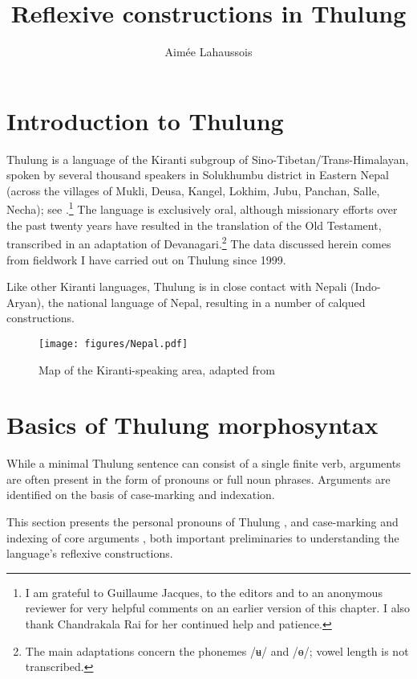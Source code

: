 \documentclass[output=paper]{langscibook}
\author{Aimée Lahaussois\affiliation{Laboratoire {Histoire} {des} {Théories} {Linguistiques}, CNRS, Université de Paris}}
\title{Reflexive constructions in Thulung}
\begin{document}
\maketitle


\section{Introduction to Thulung}
\label{sec:Lahaussois:1}

Thulung is a language of the Kiranti subgroup of Sino-Tibetan/Trans-Himalayan, spoken by several thousand speakers in Solukhumbu district in Eastern Nepal (across the villages of Mukli, Deusa, Kangel, Lokhim, Jubu, Panchan, Salle, Necha); see .\footnote{I am grateful to Guillaume Jacques, to the editors and to an anonymous reviewer for very helpful comments on an earlier version of this chapter.  I also thank Chandrakala Rai for her continued help and patience.}  The language is exclusively oral, although missionary efforts over the past twenty years have resulted in the translation of the Old Testament, transcribed in an adaptation of Devanagari.\footnote{The main adaptations concern the phonemes /ʉ/ and /ɵ/; vowel length is not transcribed.}  The data discussed herein comes from fieldwork I have carried out on Thulung since 1999.

Like other Kiranti languages, Thulung is in close contact with Nepali (Indo-Aryan), the national language of Nepal, resulting in a number of calqued constructions.


\begin{figure}
\texttt{[image: figures/Nepal.pdf]}
\caption{Map of the Kiranti-speaking area, adapted from \citet{Schlemmer2019}}
\label{fig:Lahaussois:1}
\end{figure}


\section{Basics of Thulung morphosyntax}
\label{sec:Lahaussois:2}

While a minimal Thulung sentence can consist of a single finite verb, arguments are often present in the form of pronouns or full noun phrases. Arguments are identified on the basis of case-marking and indexation.

This section presents the personal pronouns of Thulung , and case-marking and indexing of core arguments , both important preliminaries to understanding the language's reflexive constructions.
\end{document}
